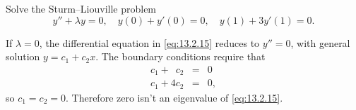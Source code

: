 \setcounter{example}{4}
\setcounter{equation}{14}
\begin{example}
  \label{example:13.2.5} \rm Solve the Sturm--Liouville problem
  \begin{equation}
    \label{eq:13.2.15}y''+\lambda y=0,\quad y(0)+y'(0)=0,\quad y(1)+3y'(1)=0.
  \end{equation}
\end{example}
\setcounter{equation}{15}
\setcounter{figure}{0}
\begin{examplesolution}
\solution If $\lambda=0$, the differential equation in \eqref{eq:13.2.15} reduces to $y''=0$, with
general solution $y=c_{1}+c_{2}x$. The boundary conditions require that
\begin{eqnarray*}
  c_{1}+\phantom{4}c_{2} & = & 0 \\
  c_{1}+4c_{2}           & = & 0,
\end{eqnarray*}
so $c_{1}=c_{2}=0$. Therefore zero isn't an eigenvalue of \eqref{eq:13.2.15}.


\end{examplesolution}
